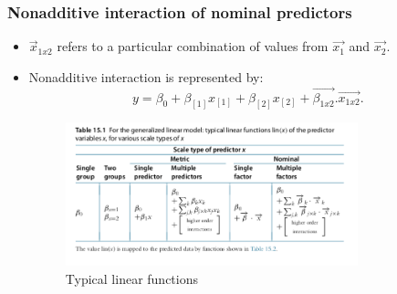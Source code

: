 \documentclass[a4paper]{article}
\begin{document}
\subsubsection{Nonadditive interaction of nominal predictors}
\begin{itemize}
    \item $\vec{x}_{1x2}$ refers to a particular combination of values from $\vec{x_1}$ and $\vec{x_2}$.
    \item Nonadditive interaction is represented by:
    \[
        y = \beta_0 + \beta_{[1]}x_{[1]} + \beta_{[2]}x_{[2]} + \vec{\beta_{1x2}} . \vec{x_{1x2}} 
    .\] 
    \begin{figure}[H]
        \centering
        \includegraphics[width=0.8\textwidth]{linear_functions}
        \caption{Typical linear functions}
        \label{fig:linear_functions}
    \end{figure}
\end{itemize}
\end{document}
